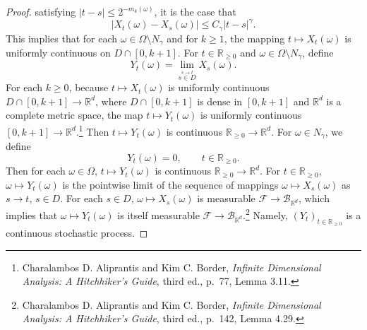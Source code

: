 \documentclass{article}
\theoremstyle{definition}
\begin{document}
\begin{proof}
satisfying $|t-s| \leq 2^{-m_k(\omega)}$, it is the case that
\begin{equation}
|X_t(\omega)-X_s(\omega)| \leq C_\gamma |t-s|^\gamma.
\label{399}
\end{equation}
This implies that for each $\omega \in \Omega \setminus N_\gamma$ and for $k \geq 1$,  the mapping
$t \mapsto X_t(\omega)$ is uniformly continuous on $D \cap [0,k+1]$. 
For $t \in \mathbb{R}_{\geq 0}$ and $\omega \in \Omega\setminus N_\gamma$, define
\begin{equation}
Y_t(\omega) = \lim_{\stackrel{s \to t}{s \in D}} X_s(\omega).
\label{3910}
\end{equation}
For each $k \geq 0$,
because $t \mapsto X_t(\omega)$ is uniformly continuous $D \cap  [0,k+1] \to \mathbb{R}^d$, 
where
$D \cap [0,k+1]$  is dense in $[0,k+1]$ and $\mathbb{R}^d$ is a complete metric space,
the map $t \mapsto Y_t(\omega)$ is uniformly continuous $[0,k+1] \to \mathbb{R}^d$.\footnote{Charalambos D. Aliprantis
and Kim C. Border, {\em Infinite Dimensional Analysis: A Hitchhiker's Guide}, third ed., p.~77, Lemma 3.11.}
Then $t \mapsto Y_t(\omega)$ is continuous $\mathbb{R}_{\geq 0} \to \mathbb{R}^d$.
For $\omega \in N_\gamma$, we define
\[
Y_t(\omega) = 0,\qquad t \in \mathbb{R}_{\geq 0}.
\]
Then for each $\omega \in \Omega$, $t \mapsto Y_t(\omega)$ is continuous $\mathbb{R}_{\geq 0} \to \mathbb{R}^d$.
For $t \in \mathbb{R}_{\geq 0}$, $\omega \mapsto Y_t(\omega)$ is the pointwise limit of the sequence of mappings
$\omega \mapsto X_s(\omega)$ as $s \to t$, $s \in D$.  For each $s \in D$, $\omega \mapsto X_s(\omega)$ is measurable
$\mathscr{F} \to \mathscr{B}_{\mathbb{R}^d}$, which implies that $\omega \mapsto Y_t(\omega)$ is itself measurable 
$\mathscr{F} \to \mathscr{B}_{\mathbb{R}^d}$.\footnote{Charalambos D. Aliprantis
and Kim C. Border, {\em Infinite Dimensional Analysis: A Hitchhiker's Guide}, third ed., p.~142, Lemma 4.29.}
 Namely, $(Y_t)_{t \in \mathbb{R}_{\geq 0}}$ is a continuous stochastic process.


\end{proof}
\end{document}
